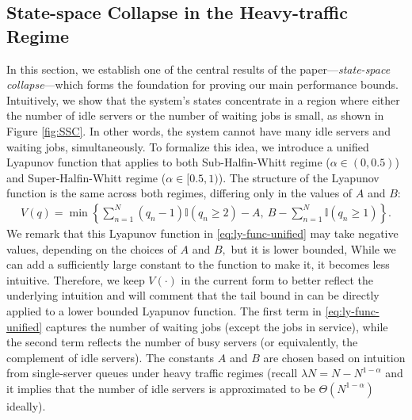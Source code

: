 \documentclass[11pt,oneside,letter]{article}
\begin{document}
\subsection{State-space Collapse in the Heavy-traffic Regime}
In this section, we establish one of the central results of the paper—\emph{state-space collapse}—which forms the foundation for proving our main performance bounds. Intuitively, we show that the system's states concentrate in a region where either the number of idle servers or the number of waiting jobs is small, as shown in Figure \ref{fig:SSC}. In other words, the system cannot have many idle servers and waiting jobs, simultaneously. To formalize this idea, we introduce a unified Lyapunov function that applies to both Sub-Halfin-Whitt regime ($\alpha \in (0, 0.5)$) and Super-Halfin-Whitt regime ($\alpha \in [0.5, 1)$). The structure of the Lyapunov function is the same across both regimes, differing only in the values of $A$ and $B$:
\begin{align}
V(q) = \min\left\{ \sum_{n=1}^{N} (q_n - 1)\mathbb{I}(q_n \geq 2) - A,\ B - \sum_{n=1}^{N} \mathbb{I}(q_n \geq 1) \right\}. \label{eq:ly-func-unified}
\end{align}
{We remark that this Lyapunov function in \eqref{eq:ly-func-unified} may take negative values, depending on the choices of $A$ and $B,$ but it is lower bounded, While we can add a sufficiently large constant to the function to make it, it becomes less intuitive.  Therefore, we keep $V(\cdot)$ in the current form to better reflect the underlying intuition and will comment that the tail bound in \cite{WanMagSri_21} can be directly applied to a lower bounded Lyapunov function.}
The first term in \eqref{eq:ly-func-unified} captures the number of waiting jobs (except the jobs in service), while the second term reflects the number of busy servers (or equivalently, the complement of idle servers). The constants \( A \) and \( B \) are chosen based on intuition from single-server queues under heavy traffic regimes (recall \( \lambda N = N - N^{1 - \alpha} \) and it implies that the number of idle servers is approximated to be \( \Theta(N^{1 - \alpha})\) ideally).  
\end{document}
